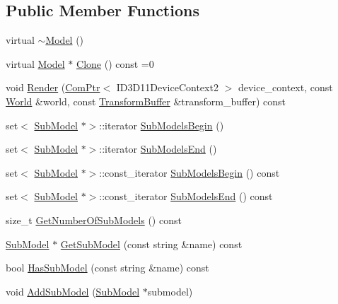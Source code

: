 \subsection*{Public Member Functions}
\begin{DoxyCompactItemize}
\item 
virtual \hyperlink{classmage_1_1_model_afc6e31cb05ca98c456db56a3e03743d7}{$\sim$\+Model} ()
\item 
virtual \hyperlink{classmage_1_1_model}{Model} $\ast$ \hyperlink{classmage_1_1_model_ae5e9bee52da0db8c7a29920c13ed40ea}{Clone} () const =0
\item 
void \hyperlink{classmage_1_1_model_ac6dd064ce66a1fe234bc41ac4ebc1ae2}{Render} (\hyperlink{namespacemage_ae74f374780900893caa5555d1031fd79}{Com\+Ptr}$<$ I\+D3\+D11\+Device\+Context2 $>$ device\+\_\+context, const \hyperlink{classmage_1_1_world}{World} \&world, const \hyperlink{structmage_1_1_transform_buffer}{Transform\+Buffer} \&transform\+\_\+buffer) const
\item 
set$<$ \hyperlink{classmage_1_1_sub_model}{Sub\+Model} $\ast$$>$\+::iterator \hyperlink{classmage_1_1_model_a8845f0db130f224f41132996a206c354}{Sub\+Models\+Begin} ()
\item 
set$<$ \hyperlink{classmage_1_1_sub_model}{Sub\+Model} $\ast$$>$\+::iterator \hyperlink{classmage_1_1_model_a44e7b26f9852046aa96dc41c01222a04}{Sub\+Models\+End} ()
\item 
set$<$ \hyperlink{classmage_1_1_sub_model}{Sub\+Model} $\ast$$>$\+::const\+\_\+iterator \hyperlink{classmage_1_1_model_a043f7ac7bbaa1bd60bec3bc517428775}{Sub\+Models\+Begin} () const
\item 
set$<$ \hyperlink{classmage_1_1_sub_model}{Sub\+Model} $\ast$$>$\+::const\+\_\+iterator \hyperlink{classmage_1_1_model_a855e215577321ff6e226c624d7bd7e39}{Sub\+Models\+End} () const
\item 
size\+\_\+t \hyperlink{classmage_1_1_model_a29ad2496b11ef5af5f179cfe52943cd3}{Get\+Number\+Of\+Sub\+Models} () const
\item 
\hyperlink{classmage_1_1_sub_model}{Sub\+Model} $\ast$ \hyperlink{classmage_1_1_model_a1cae9eb62a353445d14b5331e88bdeac}{Get\+Sub\+Model} (const string \&name) const
\item 
bool \hyperlink{classmage_1_1_model_a319fb9b9d9c673ed9c83325d5bcbdfd7}{Has\+Sub\+Model} (const string \&name) const
\item 
void \hyperlink{classmage_1_1_model_abf3f207329b5d4482e515e206e856295}{Add\+Sub\+Model} (\hyperlink{classmage_1_1_sub_model}{Sub\+Model} $\ast$submodel)
\end{DoxyCompactItemize}
